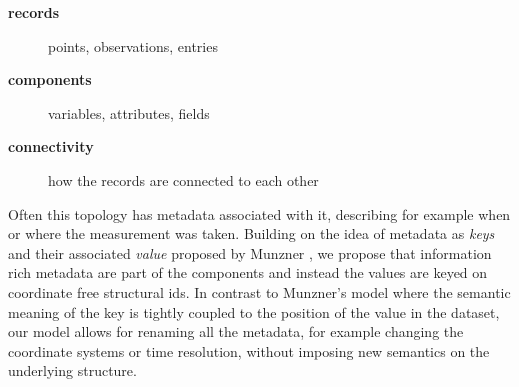 \documentclass[../main.tex]{subfiles}
\begin{document}
\begin{mdframed}[roundcorner=10pt, frametitle= definitions, frametitlerule=true, frametitlebackgroundcolor=gray!10]
    \begin{description}
        \item[\textbf{records}] points, observations, entries 
        \item[\textbf{components}] variables, attributes, fields 
        \item[\textbf{connectivity}] how the records are connected to each other
    \end{description}
\end{mdframed}

Often this topology has metadata associated with it, describing for example when or where the measurement was taken. Building on the idea of metadata as \textit{keys} and their associated \textit{value} proposed by Munzner \cite{munznerChDataAbstraction}, we propose that information rich metadata are part of the components and instead the values are keyed on coordinate free structural ids. In contrast to Munzner's model where the semantic meaning of the key is tightly coupled to the position of the value in the dataset, our model allows for renaming all the metadata, for example changing the coordinate systems or time resolution, without imposing new semantics on the underlying structure.
\end{document}
